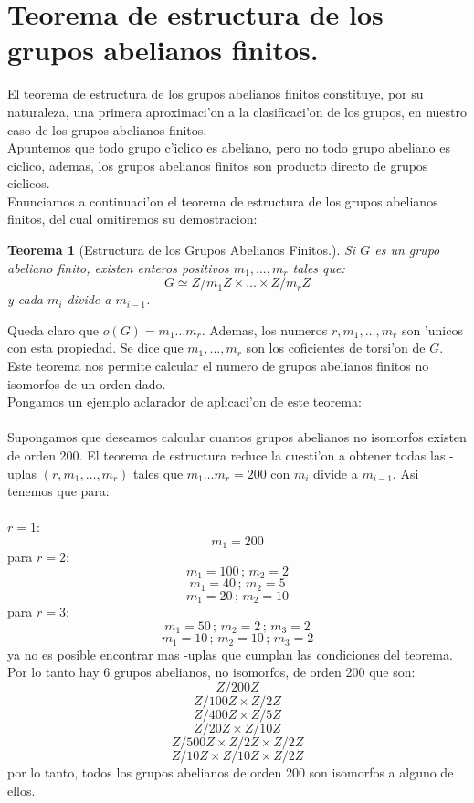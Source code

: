 \documentclass[a4paper,openright,12pt]{book}
\numberwithin{equation}{section} %
\newtheorem{teorema}{Teorema}[section] %
\begin{document}
\section{Teorema de estructura de los grupos abelianos finitos.}
El teorema de estructura de los grupos abelianos finitos constituye, por su naturaleza, una primera aproximaci'on a la clasificaci'on de los grupos, en nuestro caso de los grupos abelianos finitos.\\
Apuntemos que todo grupo c'iclico es abeliano, pero no todo grupo abeliano es ciclico, ademas, los grupos abelianos finitos son producto directo de grupos ciclicos.\\
Enunciamos a continuaci'on el teorema de estructura de los grupos abelianos finitos, del cual omitiremos su demostracion:
\begin{teorema}[Estructura de los Grupos Abelianos Finitos.]
Si $G$ es un grupo abeliano finito, existen enteros positivos $m_{1},\ldots ,m_{r}$ tales que:
\[
G \simeq Z/m_{1}Z \times \ldots \times Z/m_{r}Z
\]
y cada $m_{i}$ divide a $m_{i-1}$.
\end{teorema}
Queda claro que $o(G)=m_{1}\ldots m_{r}$. Ademas, los numeros $r, m_{1},\ldots ,m_{r}$ son 'unicos con esta propiedad. Se dice que $m_{1},\ldots ,m_{r}$ son los coficientes de torsi'on de $G$.\\
Este teorema nos permite calcular el numero de grupos abelianos finitos no isomorfos de un orden dado.\\
Pongamos un ejemplo aclarador de aplicaci'on de este teorema:\\
\\
Supongamos que deseamos calcular cuantos grupos abelianos no isomorfos existen de orden 200. El teorema de estructura reduce la cuesti'on a obtener todas las -uplas $(r,m_{1},\ldots ,m_{r})$ tales que $m_{1}\ldots m_{r}=200$ con $m_{i}$ divide a $m_{i-1}$. Asi tenemos que para:\\
\\
$r=1$:
\[
m_{1}=200
\] 
para $r=2$:
\[
m_{1}=100\, ; \,m_{2}=2
\]
\[
m_{1}=40\, ; \,m_{2}=5
\]
\[
m_{1}=20\, ; \,m_{2}=10
\]
para $r=3$:
\[
m_{1}=50\, ; \,m_{2}=2\, ; \, m_{3}=2
\]
\[
m_{1}=10\, ; \,m_{2}=10\, ; \, m_{3}=2
\]
ya no es posible encontrar mas -uplas que cumplan las condiciones del teorema. Por lo tanto hay 6 grupos abelianos, no isomorfos, de orden 200 que son:
\[
Z/200Z
\]
\[
Z/100Z \times Z/2Z
\]
\[
Z/400Z \times Z/5Z
\]
\[
Z/20Z \times Z/10Z
\]
\[
Z/500Z \times Z/2Z \times Z/2Z
\]
\[
Z/10Z \times Z/10Z \times Z/2Z
\]
por lo tanto, todos los grupos abelianos de orden 200 son isomorfos a alguno de ellos.
\end{document}
